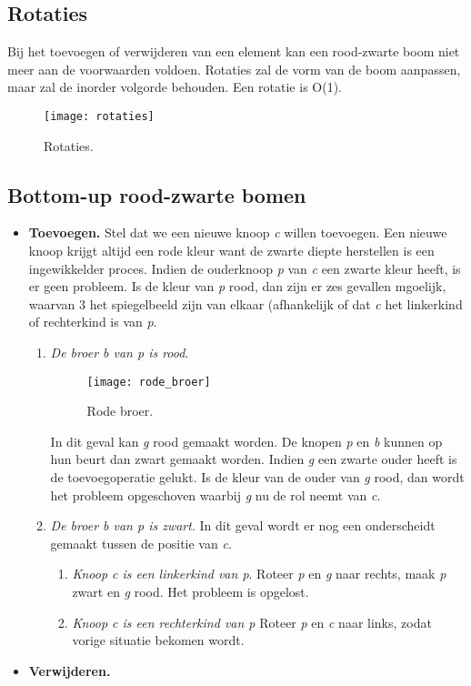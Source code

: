 \documentclass{report}
\begin{document}
	\subsection{Rotaties}
	Bij het toevoegen of verwijderen van een element kan een rood-zwarte boom niet meer aan de voorwaarden voldoen. Rotaties zal de vorm van de boom aanpassen, maar zal de inorder volgorde behouden. Een rotatie is O(1).
   	\begin{figure}[h]
	   	\centering
	   	\texttt{[image: rotaties]}
	   	\caption{Rotaties.}
	   	\label{fig:rotaties}
    \end{figure}
	
	\subsection{Bottom-up rood-zwarte bomen}
	\begin{itemize}
		\item \textbf{Toevoegen.} Stel dat we een nieuwe knoop \textit{c} willen toevoegen. Een nieuwe knoop krijgt altijd een rode kleur want de zwarte diepte herstellen is een ingewikkelder proces. Indien de ouderknoop \textit{p} van \textit{c} een zwarte kleur heeft, is er geen probleem. Is de kleur van \textit{p} rood, dan zijn er zes gevallen mgoelijk, waarvan 3 het spiegelbeeld zijn van elkaar (afhankelijk of dat \textit{c} het linkerkind of rechterkind is van \textit{p}.
		\begin{enumerate}
			\item \textit{De broer b van p is rood}. 
		   	\begin{figure}[h]
				\centering
				\texttt{[image: rode\_broer]}
				\caption{Rode broer.}
				\label{fig:rode_broer}
			\end{figure}
			In dit geval kan \textit{g} rood gemaakt worden. De knopen \textit{p} en \textit{b} kunnen op hun beurt dan zwart gemaakt worden. Indien \textit{g} een zwarte ouder heeft is de toevoegoperatie gelukt. Is de kleur van de ouder van \textit{g} rood, dan wordt het probleem opgeschoven waarbij \textit{g} nu de rol neemt van \textit{c}.
			\item \textit{De broer b van p is zwart}. In dit geval wordt er nog een onderscheidt gemaakt tussen de positie van \textit{c}.
			\begin{enumerate}
				\item \textit{Knoop c is een linkerkind van p}. Roteer \textit{p} en \textit{g} naar rechts, maak \textit{p} zwart en \textit{g} rood. Het probleem is opgelost.
				\item \textit{Knoop c is een rechterkind van p} Roteer \textit{p} en \textit{c} naar links, zodat vorige situatie bekomen wordt.
				
			\end{enumerate}
		\end{enumerate}
		\item \textbf{Verwijderen.}
	\end{itemize}
	
\end{document}
